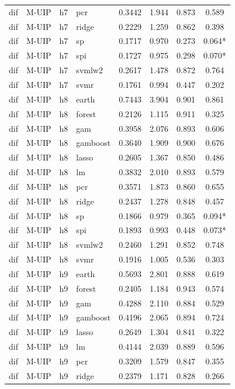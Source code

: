 \begin{ThreePartTable}
\begin{longtable}[t]{llclcccc}
dif & M-UIP & h7 & pcr & 0.3442 & 1.944 & 0.873 & 0.589\\
dif & M-UIP & h7 & ridge & 0.2229 & 1.259 & 0.862 & 0.398\\
dif & M-UIP & h7 & sp & 0.1717 & 0.970 & 0.273 & 0.064*\\
dif & M-UIP & h7 & spi & 0.1727 & 0.975 & 0.298 & 0.070*\\
dif & M-UIP & h7 & svmlw2 & 0.2617 & 1.478 & 0.872 & 0.764\\
dif & M-UIP & h7 & svmr & 0.1761 & 0.994 & 0.447 & 0.202\\
\addlinespace
dif & M-UIP & h8 & earth & 0.7443 & 3.904 & 0.901 & 0.861\\
dif & M-UIP & h8 & forest & 0.2126 & 1.115 & 0.911 & 0.325\\
dif & M-UIP & h8 & gam & 0.3958 & 2.076 & 0.893 & 0.606\\
dif & M-UIP & h8 & gamboost & 0.3640 & 1.909 & 0.900 & 0.676\\
dif & M-UIP & h8 & lasso & 0.2605 & 1.367 & 0.850 & 0.486\\
dif & M-UIP & h8 & lm & 0.3832 & 2.010 & 0.893 & 0.579\\
dif & M-UIP & h8 & pcr & 0.3571 & 1.873 & 0.860 & 0.655\\
dif & M-UIP & h8 & ridge & 0.2437 & 1.278 & 0.848 & 0.457\\
dif & M-UIP & h8 & sp & 0.1866 & 0.979 & 0.365 & 0.094*\\
dif & M-UIP & h8 & spi & 0.1893 & 0.993 & 0.448 & 0.073*\\
dif & M-UIP & h8 & svmlw2 & 0.2460 & 1.291 & 0.852 & 0.748\\
dif & M-UIP & h8 & svmr & 0.1916 & 1.005 & 0.536 & 0.303\\
\addlinespace
dif & M-UIP & h9 & earth & 0.5693 & 2.801 & 0.888 & 0.619\\
dif & M-UIP & h9 & forest & 0.2405 & 1.184 & 0.943 & 0.574\\
dif & M-UIP & h9 & gam & 0.4288 & 2.110 & 0.884 & 0.529\\
dif & M-UIP & h9 & gamboost & 0.4196 & 2.065 & 0.894 & 0.724\\
dif & M-UIP & h9 & lasso & 0.2649 & 1.304 & 0.841 & 0.322\\
dif & M-UIP & h9 & lm & 0.4144 & 2.039 & 0.889 & 0.596\\
dif & M-UIP & h9 & pcr & 0.3209 & 1.579 & 0.847 & 0.355\\
dif & M-UIP & h9 & ridge & 0.2379 & 1.171 & 0.828 & 0.266\\

\end{longtable}
\end{ThreePartTable}
